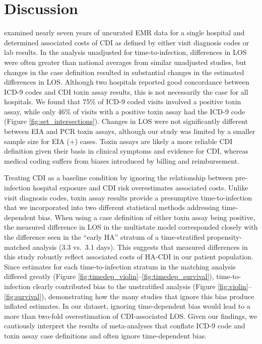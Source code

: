 \section{Discussion}

 examined nearly seven years of uncurated EMR data for a single hospital and determined associated costs of CDI as defined by either visit diagnosis codes or lab results. In the analysis unadjusted for time-to-infection, differences in LOS were often greater than national averages from similar unadjusted studies,\autocite{Gabriel2014,Zhang2016,Zimlichman2013} but changes in the case definition resulted in substantial changes in the estimated differences in LOS. Although two hospitals reported good concordance between ICD-9 codes and CDI toxin assay results,\autocite{Dubberke2006,Scheurer2007} this is not necessarily the case for all hospitals. We found that 75\% of ICD-9 coded visits involved a positive toxin assay, while only 46\% of visits with a positive toxin assay had the ICD-9 code (Figure \ref{fig:set_intersections}). Changes in LOS were not significantly different between EIA and PCR toxin assays, although our study was limited by a smaller sample size for EIA (+) cases. Toxin assays are likely a more reliable CDI definition given their basis in clinical symptoms and evidence for CDI, whereas medical coding suffers from biases introduced by billing and reimbursement.\autocite{Rhee2015,Romano1994}

Treating CDI as a baseline condition by ignoring the relationship between pre-infection hospital exposure and CDI risk overestimates associated costs.\autocite{Graves2010,Mitchell2014,Stevens2015} Unlike visit diagnosis codes, toxin assay results provide a presumptive time-to-infection that we incorporated into two different statistical methods addressing time-dependent bias. When using a case definition of either toxin assay being positive, the measured difference in LOS in the multistate model corresponded closely with the difference seen in the “early HA” stratum of a time-stratified propensity-matched analysis (3.3 vs.\ 3.1 days). This suggests that measured differences in this study robustly reflect associated costs of HA-CDI in our patient population. Since estimates for each time-to-infection stratum in the matching analysis differed greatly (Figure \ref{fig:timedep_violin}–\ref{fig:timedep_survival}), time-to-infection clearly contributed bias to the unstratified analysis (Figure \ref{fig:violin}–\ref{fig:survival}), demonstrating how the many studies that ignore this bias\autocite{Gabriel2014,Zhang2016,Zimlichman2013} produce inflated estimates. In our dataset, ignoring time-dependent bias would lead to a more than two-fold overestimation of CDI-associated LOS. Given our findings, we cautiously interpret the results of meta-analyses that conflate ICD-9 code and toxin assay case definitions and often ignore time-dependent bias.\autocite{Gabriel2014,Ghantoji2010,Zhang2016}  

